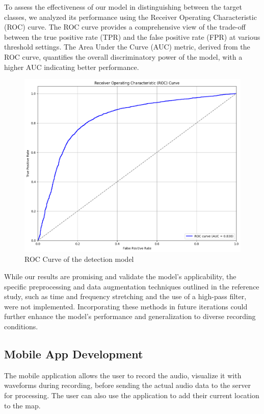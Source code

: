 To assess the effectiveness of our model in distinguishing between the target
classes, we analyzed its performance using the Receiver Operating
Characteristic (ROC) curve. The ROC curve provides a comprehensive view of the
trade-off between the true positive rate (TPR) and the false positive rate
(FPR) at various threshold settings. The Area Under the Curve (AUC) metric,
derived from the ROC curve, quantifies the overall discriminatory power of the
model, with a higher AUC indicating better performance.
\begin{figure}[h!]
    \centering
    \includegraphics[scale=0.35]{images/det_roc.png}
    \caption{ROC Curve of the detection model}
    \label{fig:ROC Curve}
\end{figure}

While our results are promising and validate the model's applicability, the
specific preprocessing and data augmentation techniques outlined in the
reference study, such as time and frequency stretching and the use of a
high-pass filter, were not implemented. Incorporating these methods in future
iterations could further enhance the model's performance and generalization to
diverse recording conditions.

\newpage

\newpage

\subsection{Mobile App Development}
The mobile application allows the user to record the audio, visualize it with
waveforms during recording, before sending the actual audio data to the server
for processing. The user can also use the application to add their current
location to the map.


